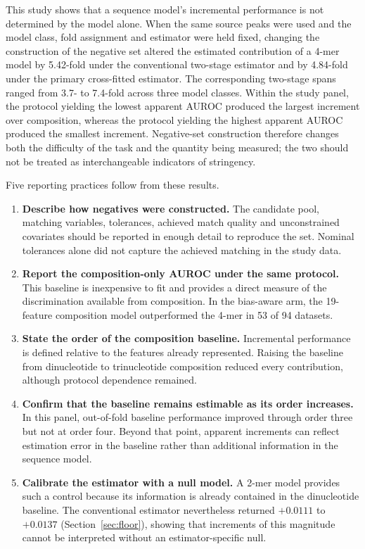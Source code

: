 This study shows that a sequence model's incremental performance is not determined by the model
alone. When the same source peaks were used and the model class, fold assignment and estimator were held fixed, changing
the construction of the negative set altered the estimated contribution of a 4-mer model by
5.42-fold under the conventional two-stage estimator and by 4.84-fold under the primary
cross-fitted estimator. The corresponding two-stage spans ranged from 3.7- to 7.4-fold across
three model classes. Within the study panel, the protocol yielding the lowest apparent AUROC produced
the largest increment over composition, whereas the protocol yielding the highest apparent
AUROC produced the smallest increment. Negative-set construction therefore changes both the
difficulty of the task and the quantity being measured; the two should not be treated as
interchangeable indicators of stringency.

Five reporting practices follow from these results.

\begin{enumerate}\setlength{\itemsep}{2pt}
\item \textbf{Describe how negatives were constructed.} The candidate pool, matching variables,
  tolerances, achieved match quality and unconstrained covariates should be reported in enough
  detail to reproduce the set. Nominal tolerances alone did not capture the achieved matching
  in the study data.
\item \textbf{Report the composition-only AUROC under the same protocol.} This baseline is
  inexpensive to fit and provides a direct measure of the discrimination available from
  composition. In the bias-aware arm, the 19-feature composition model outperformed the 4-mer
  in 53 of 94 datasets.
\item \textbf{State the order of the composition baseline.} Incremental performance is defined
  relative to the features already represented. Raising the baseline from dinucleotide to
  trinucleotide composition reduced every contribution, although protocol dependence remained.
\item \textbf{Confirm that the baseline remains estimable as its order increases.} In this panel,
  out-of-fold baseline performance improved through order three but not at order four. Beyond that
  point, apparent increments can reflect estimation error in the baseline rather than additional
  information in the sequence model.
\item \textbf{Calibrate the estimator with a null model.} A 2-mer model provides such a control
  because its information is already contained in the dinucleotide baseline. The conventional
  estimator nevertheless returned $+0.0111$ to $+0.0137$ (Section~\ref{sec:floor}), showing that
  increments of this magnitude cannot be interpreted without an estimator-specific null.
\end{enumerate}


